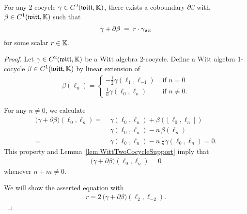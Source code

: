 \begin{lemma}
  \label{lem:WittTwoCocycleNormalization}
  \leanok
  For any 2-cocycle $\gamma \in C^2(\mathfrak{witt},\mathbb{K})$, there exists
  a coboundary $\partial \beta$ with $\beta \in C^1(\mathfrak{witt},\mathbb{K})$
  such that
  \begin{align*}
    \gamma + \partial \beta \; = \; r \cdot {\gamma}_{\mathfrak{vir}}
  \end{align*}
  for some scalar $r \in \mathbb{K}$.
\end{lemma}
\begin{proof}
  \leanok
  Let $\gamma \in C^2(\mathfrak{witt},\mathbb{K})$ be a Witt algebra 2-cocycle.
  Define a Witt algebra 1-cocycle $\beta \in C^1(\mathfrak{witt},\mathbb{K})$ by linear extension of
  \begin{align*}
    \beta (\ell_n) =
    \begin{cases}
      -\frac{1}{2} \gamma(\ell_1, \ell_{-1}) & \text{ if } n = 0 \\
      \frac{1}{n} \gamma(\ell_0, \ell_n) & \text{ if } n \ne 0 .
    \end{cases}
  \end{align*}

  For any $n \ne 0$, we calculate
  \begin{align*}
           \big( \gamma + \partial \beta \big) (\ell_0 , \ell_n)
    = \; & \gamma (\ell_0 , \ell_n) + \beta ([\ell_0,\ell_n]) \\
    = \; & \gamma (\ell_0 , \ell_n) - n \, \beta (\ell_n) \\
    = \; & \gamma (\ell_0 , \ell_n) - n \, \frac{1}{n}\gamma(\ell_0, \ell_n) = 0 .
  \end{align*}
  This property and Lemma~\ref{lem:WittTwoCocycleSupport} imply that
  \begin{align*}
    \big( \gamma + \partial \beta \big) (\ell_0 , \ell_n) = 0
  \end{align*}
  whenever $n+m \ne 0$.

  We will show the asserted equation with
  \begin{align*}
    r = 2 \, \big( \gamma + \partial \beta \big) ( \ell_2, \ell_{-2}) .
  \end{align*}


\end{proof}
